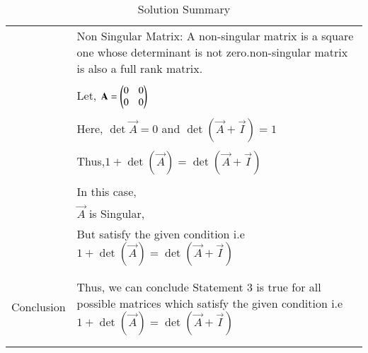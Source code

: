 \begin{longtable}{|p{5cm}|p{13cm}|}
   & Non Singular Matrix:
   A non-singular matrix is a square one whose determinant is not zero.non-singular matrix is also  a full rank matrix.\\
   &\\
   & Let, $\mathbf{A}=\begin{pmatrix}0&0\\0&0\end{pmatrix}$\\
	&\\
	& Here, $\det{\vec{A}}=0$ and $\det(\vec{A}+\vec{I})=1$\\
	&\\
	& Thus,$1+\det(\vec{A})=\det(\vec{A}+\vec{I})$\\
	&\\
	& In this case, \\
	& $\vec{A}$ is Singular,\\ & But satisfy the given condition i.e $1+\det(\vec{A})=\det(\vec{A}+\vec{I})$ \\ 
	&\\
	\hline
	\multirow{3}{*}{Conclusion} &\\
	& Thus, we can conclude Statement 3 is true for all possible matrices which satisfy the given condition i.e 
	$1+\det(\vec{A})=\det(\vec{A}+\vec{I})$\\
	&\\
	\hline
	\caption{Solution Summary}
    \label{eq:solutions/2018/june/28/table:1}
\end{longtable}

\twocolumn
